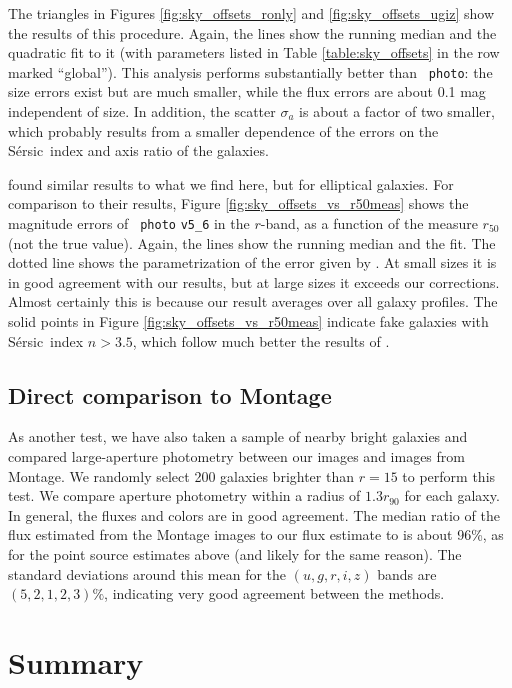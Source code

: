 \documentclass[10pt,preprint]{aastex}
\newcommand{\Sersic}{S\'ersic}
\begin{document}
The triangles in Figures \ref{fig:sky_offsets_ronly} and
\ref{fig:sky_offsets_ugiz} show the results of this procedure. Again,
the lines show the running median and the quadratic fit to it (with
parameters listed in Table \ref{table:sky_offsets} in the row marked
``global''). This analysis performs substantially better than {\tt
  photo}: the size errors exist but are much smaller, while the flux
errors are about 0.1 mag independent of size. In addition, the scatter
$\sigma_a$ is about a factor of two smaller, which probably results
from a smaller dependence of the errors on the \Sersic\ index and axis
ratio of the galaxies.

\citet{hyde09a} found similar results to what we find here, but for
elliptical galaxies. For comparison to their results, Figure
\ref{fig:sky_offsets_vs_r50meas} shows the magnitude errors of {\tt
  photo} {\tt v5\_6} in the $r$-band, as a function of the measure
$r_{50}$ (not the true value).  Again, the lines show the running
median and the fit. The dotted line shows the parametrization of the
error given by \citet{hyde09a}. At small sizes it is in good agreement
with our results, but at large sizes it exceeds our corrections.
Almost certainly this is because our result averages over all galaxy
profiles. The solid points in Figure \ref{fig:sky_offsets_vs_r50meas}
indicate fake galaxies with \Sersic\ index $n>3.5$, which follow much
better the results of \citet{hyde09a}.

\subsection{Direct comparison to Montage}
\label{sec:galmontage}

As another test, we have also taken a sample of nearby bright galaxies
and compared large-aperture photometry between our images and images
from Montage. We randomly select 200 galaxies brighter than $r=15$ to
perform this test. We compare aperture photometry within a radius of
$1.3 r_{90}$ for each galaxy. In general, the fluxes and colors are in
good agreement. The median ratio of the flux estimated from the
Montage images to our flux estimate to is about 96\%, as for the point
source estimates above (and likely for the same reason). The standard
deviations around this mean for the $(u,g,r,i,z)$ bands are
$(5,2,1,2,3)\%$, indicating very good agreement between the methods.

\section{ Summary}
\label{sec:summary}
\end{document}
